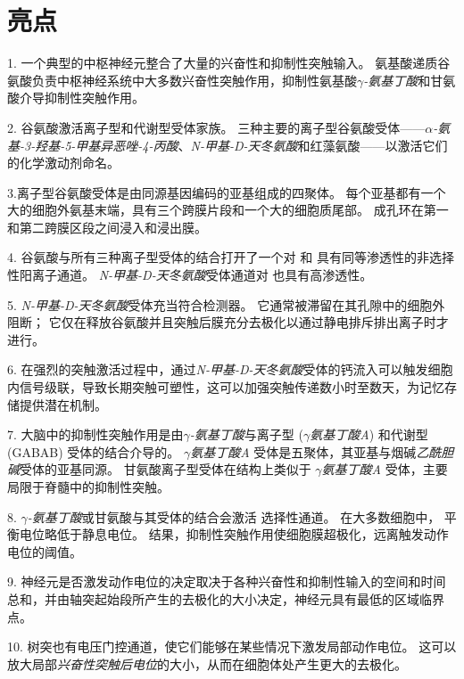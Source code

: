 \section{亮点}

1. 一个典型的中枢神经元整合了大量的兴奋性和抑制性突触输入。
氨基酸递质谷氨酸负责中枢神经系统中大多数兴奋性突触作用，抑制性氨基酸\textit{$\gamma$-氨基丁酸}和甘氨酸介导抑制性突触作用。 


2. 谷氨酸激活离子型和代谢型受体家族。
三种主要的离子型谷氨酸受体——\textit{$\alpha$-氨基-3-羟基-5-甲基异恶唑-4-丙酸}、\textit{N-甲基-D-天冬氨酸}和红藻氨酸——以激活它们的化学激动剂命名。 


3.离子型谷氨酸受体是由同源基因编码的亚基组成的四聚体。
每个亚基都有一个大的细胞外氨基末端，具有三个跨膜片段和一个大的细胞质尾部。
成孔环在第一和第二跨膜区段之间浸入和浸出膜。 


4. 谷氨酸与所有三种离子型受体的结合打开了一个对  和  具有同等渗透性的非选择性阳离子通道。
\textit{N-甲基-D-天冬氨酸}受体通道对  也具有高渗透性。


5. \textit{N-甲基-D-天冬氨酸}受体充当符合检测器。
它通常被滞留在其孔隙中的细胞外  阻断；
它仅在释放谷氨酸并且突触后膜充分去极化以通过静电排斥排出离子时才进行。 


6. 在强烈的突触激活过程中，通过\textit{N-甲基-D-天冬氨酸}受体的钙流入可以触发细胞内信号级联，导致长期突触可塑性，这可以加强突触传递数小时至数天，为记忆存储提供潜在机制。 


7. 大脑中的抑制性突触作用是由\textit{$\gamma$-氨基丁酸}与离子型 (\textit{$\gamma$氨基丁酸A}) 和代谢型 (GABAB) 受体的结合介导的。
\textit{$\gamma$氨基丁酸A} 受体是五聚体，其亚基与烟碱\textit{乙酰胆碱}受体的亚基同源。
甘氨酸离子型受体在结构上类似于 \textit{$\gamma$氨基丁酸A} 受体，主要局限于脊髓中的抑制性突触。 


8. \textit{$\gamma$-氨基丁酸}或甘氨酸与其受体的结合会激活  选择性通道。
在大多数细胞中， 平衡电位略低于静息电位。
结果，抑制性突触作用使细胞膜超极化，远离触发动作电位的阈值。 


9. 神经元是否激发动作电位的决定取决于各种兴奋性和抑制性输入的空间和时间总和，并由轴突起始段所产生的去极化的大小决定，神经元具有最低的区域临界点。 


10. 树突也有电压门控通道，使它们能够在某些情况下激发局部动作电位。
这可以放大局部\textit{兴奋性突触后电位}的大小，从而在细胞体处产生更大的去极化。






